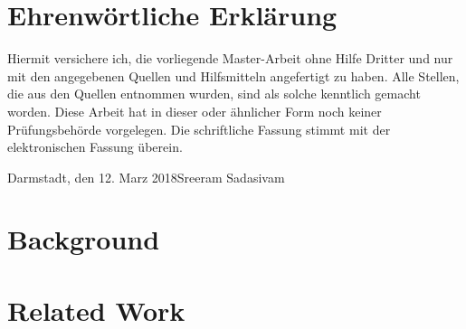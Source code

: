 \documentclass[longdoc,accentcolor=tud2b,12pt,paper=a4]{tudreport}
\title{\deedsTitle}
\subtitle{\deedsThesisType}
\newcounter{dummy} %
\newcommand{\deedsThesisType}{Master-Arbeit\xspace} %
\newcommand{\deedsName}{Sreeram Sadasivam\xspace}
\newcommand{\deedsSubmissionDate}{12. Marz 2018\xspace}%
\begin{document}
	\frenchspacing
	\raggedbottom
	\maketitle
	
	\chapter*{Ehrenw\"ortliche Erkl\"arung}
	Hiermit versichere ich, die vorliegende \deedsThesisType ohne Hilfe Dritter und nur mit den angegebenen Quellen
    und Hilfsmitteln angefertigt zu haben. Alle Stellen, die aus den Quellen entnommen wurden, sind als solche
    kenntlich gemacht worden. Diese Arbeit hat in dieser oder \"ahnlicher Form noch keiner Pr\"ufungsbeh\"orde vorgelegen.
    Die schriftliche Fassung stimmt mit der elektronischen Fassung \"uberein.
    
	
	\vspace{1.5cm}
	
	\noindent Darmstadt, den \deedsSubmissionDate\hfill \deedsName
	
	\tableofcontents
	\listoffigures
	\listoftables

	\begin{abstract}
	Abstract comes here...
	\end{abstract}		
	
	
	\cleardoublepage
	\chapter{Background}
	
	
	\chapter{Related Work}
	
	
	
\end{document}
